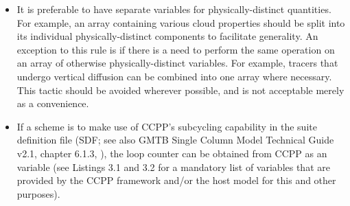 \documentclass[letterpaper,10pt,english]{sphinxmanual}
\begin{document}
\begin{itemize}
\begin{description}
\begin{itemize}
\end{itemize}

\end{description}

\item {} 
It is preferable to have separate variables for physically-distinct quantities. For example,
an array containing various cloud properties should be split into its individual
physically-distinct components to facilitate generality. An exception to this rule is if
there is a need to perform the same operation on an array of otherwise physically-distinct
variables. For example, tracers that undergo vertical diffusion can be combined into one array
where necessary. This tactic should be avoided wherever possible, and is not acceptable merely
as a convenience.

\item {} 
If a scheme is to make use of CCPP’s subcycling capability in the suite definition
file (SDF; see also GMTB Single Column Model Technical Guide v2.1, chapter 6.1.3,
), the loop counter can be obtained from CCPP as
an  variable (see Listings 3.1 and 3.2 for a mandatory list of variables
that are provided by the CCPP framework and/or the host model for this and other purposes).

\end{itemize}
\end{document}
